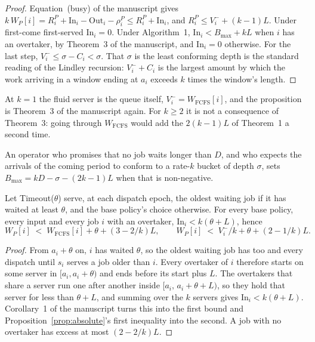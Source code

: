 \begin{proof}
Equation~(busy) of the manuscript gives
$k\,W_P[i] = R^P_i + \mathrm{In}_i - \mathrm{Out}_i - \rho^P_i \le R^P_i + \mathrm{In}_i$,
and $R^P_i \le V_i^- + (k-1)L$. Under first-come first-served $\mathrm{In}_i = 0$.
Under Algorithm~1, $\mathrm{In}_i < B_{\max} + kL$ when $i$ has an overtaker, by
Theorem~3 of the manuscript, and $\mathrm{In}_i = 0$ otherwise. For the last step,
$V_i^- \le \sigma - C_i < \sigma$. That $\sigma$ is the least conforming depth is the
standard reading of the Lindley recursion: $V_i^- + C_i$ is the largest amount by
which the work arriving in a window ending at $a_i$ exceeds $k$ times the window's
length.
\end{proof}

At $k = 1$ the fluid server is the queue itself, $V_i^- = W_{\mathrm{FCFS}}[i]$, and the
proposition is Theorem~3 of the manuscript again. For $k \ge 2$ it is not a
consequence of Theorem~3: going through $W_{\mathrm{FCFS}}$ would add the
$2(k-1)L$ of Theorem~1 a second time.

\begin{corollary}
\label{cor:absolute}
An operator who promises that no job waits longer than $D$, and who expects the
arrivals of the coming period to conform to a rate-$k$ bucket of depth $\sigma$, sets
$B_{\max} = kD - \sigma - (2k-1)L$ when that is non-negative.
\end{corollary}

\begin{proposition}
\label{prop:clock}
Let Timeout($\theta$) serve, at each dispatch epoch, the oldest waiting job if it has
waited at least $\theta$, and the base policy's choice otherwise. For every base
policy, every input and every job $i$ with an overtaker,
$\mathrm{In}_i < k(\theta + L)$, hence
\[
  W_P[i] \;<\; W_{\mathrm{FCFS}}[i] + \theta + (3 - 2/k)L,
  \qquad
  W_P[i] \;<\; V_i^-/k + \theta + (2 - 1/k)L .
\]
\end{proposition}

\begin{proof}
From $a_i + \theta$ on, $i$ has waited $\theta$, so the oldest waiting job has too and
every dispatch until $s_i$ serves a job older than $i$. Every overtaker of $i$ therefore
starts on some server in $[a_i, a_i + \theta)$ and ends before its start plus $L$. The
overtakers that share a server run one after another inside
$[a_i,\, a_i + \theta + L)$, so they hold that server for less than $\theta + L$, and
summing over the $k$ servers gives $\mathrm{In}_i < k(\theta + L)$. Corollary~1 of the
manuscript turns this into the first bound and Proposition~\ref{prop:absolute}'s first
inequality into the second. A job with no overtaker has excess at most $(2-2/k)L$.
\end{proof}

